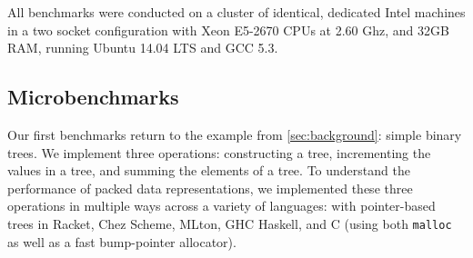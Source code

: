 \documentclass[a4paper,english]{lipics-v2016}
\begin{document}
All benchmarks were conducted on a cluster of identical, dedicated Intel
machines in a two socket configuration with Xeon E5-2670 CPUs at 2.60 Ghz, and
32GB RAM, running Ubuntu 14.04 LTS and GCC 5.3.

\subsection{Microbenchmarks}\label{sec:microbench}

Our first benchmarks return to the example from \cref{sec:background}:
simple binary trees. We implement three operations:
constructing a tree, incrementing the values in a tree, and summing
the elements of a tree. To understand the performance of packed data
representations, we implemented these three operations in multiple
ways across a variety of languages: with pointer-based trees in
Racket, Chez Scheme, MLton, GHC Haskell, and C (using both \texttt{malloc} as well
as a fast bump-pointer allocator).
\end{document}

